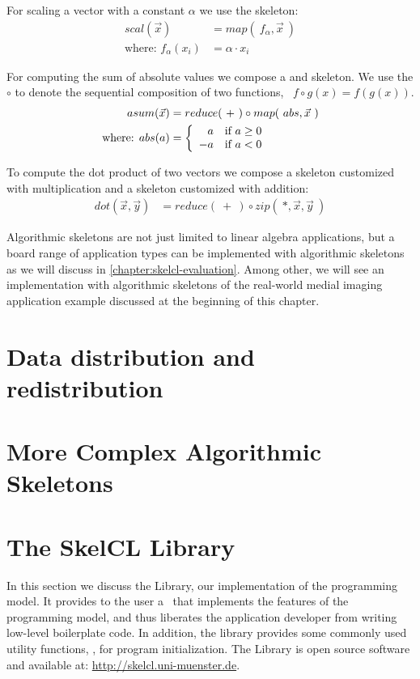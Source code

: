 For scaling a vector with a constant $\alpha$ we use the \map skeleton:
\begin{align*}
  scal(\vec{x}) &= map(\ f_{\alpha}, \vec{x}\ )\\
  \text{where: } f_{\alpha}(x_i) &= \alpha \cdot x_i
\end{align*}

\noindent
For computing the sum of absolute values we compose a \map and \reduce skeleton.
We use the $\circ$ to denote the sequential composition of two functions, \ie\ $f \circ g(x) = f(g(x))$.
\begin{align*}
  asum(\vec{x}) &= reduce(\ +\ ) \circ map(\ abs, \vec{x}\ )\\
  \text{where: } abs(a) &=
    \left\{
      \begin{array}{r l}
      a & \text{if } a \geq 0\\
      -a & \text{if } a < 0
      \end{array}
    \right.
\end{align*}

\noindent
To compute the dot product of two vectors we compose a \zip skeleton customized with multiplication and a \reduce skeleton customized with addition:
\begin{align*}
  dot(\vec{x}, \vec{y}) &= reduce(\ +\ ) \circ zip(\ *, \vec{x}, \vec{y}\ )
\end{align*}

\noindent
Algorithmic skeletons are not just limited to linear algebra applications, but a board range of application types can be implemented with algorithmic skeletons as we will discuss in \autoref{chapter:skelcl-evaluation}.
Among other, we will see an implementation with algorithmic skeletons of the real-world medial imaging application example discussed at the beginning of this chapter.

\section{Data distribution and redistribution}


\section{More Complex Algorithmic Skeletons}



\section{The SkelCL Library}
\label{section:skelcl-library}
In this section we discuss the \SkelCL Library, our implementation of the \SkelCL programming model.
It provides to the user a \Cpp~\API that implements the features of the \SkelCL programming model, and thus liberates the application developer from writing low-level boilerplate code.
In addition, the library provides some commonly used utility functions, \eg, for program initialization.
The \SkelCL Library is open source software and available at: \url{http://skelcl.uni-muenster.de}.

